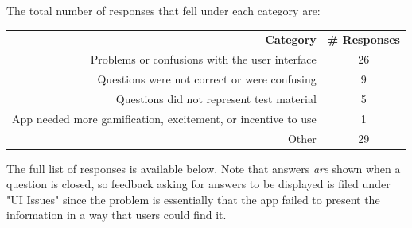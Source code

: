 \par The total number of responses that fell under each category are:

\vspace{1.0cm}

\begin{tabular}{ r c }
	\textbf{Category} & \textbf{\# Responses} \\
	Problems or confusions with the user interface & 26 \\
	Questions were not correct or were confusing  & 9 \\
	Questions did not represent test material  & 5 \\
	App needed more gamification, excitement, or incentive to use  & 1 \\
	Other  & 29 \\
\end{tabular}

\vspace{2.0cm}

\par The full list of responses is available below. Note that answers \textit{are} shown when a question is closed, so feedback asking for answers to be displayed is filed under "UI Issues" since the problem is essentially that the app failed to present the information in a way that users could find it.





 